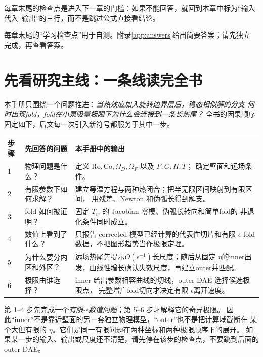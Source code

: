\documentclass[UTF8,zihao=-4,openany]{ctexbook}
\newcommand{\eps}{\epsilon}
\newcommand{\Ro}{\mathrm{Ro}}
\newcommand{\Co}{\mathrm{Co}}
\begin{document}
每章末尾的检查点是进入下一章的门槛：如果不能回答，就回到本章中标为“输入--
代入--输出”的三行，而不是跳过公式直接看结论。

每章末尾的“学习检查点”用于自测。附录\ref{app:answers}给出简要答案；请先独立
完成，再查看答案。

\chapter*{先看研究主线：一条线读完全书}

本手册只围绕一个问题推进：\emph{当热效应加入旋转边界层后，稳态相似解的分支
何时出现fold，fold在小泵吸量极限下为什么会连接到一条长热尾？} 全书的因果顺序
固定如下，后文每一次引入新符号都服务于其中一步。

\begin{center}
\begin{tabular}{p{}p{}p{}}
\toprule
步骤 & 先回答的问题 & 本手册中的输出 \\
\midrule
1 & 物理问题是什么？ & 定义 $\Ro,\Co,\Omega_D,\Omega_F$ 以及 $F,G,H,T$；
确定壁面和远场条件。 \\
2 & 有限参数下如何求解？ & 建立等温方程与两种热闭合；把半无限区间映射到有限区间，
用残差、Newton 和伪弧长得到解支。 \\
3 & fold 如何被证明？ & 固定 $T_w$ 的 Jacobian 零模、伪弧长转向和简单fold的
非退化条件同时成立。 \\
4 & 数值上看到了什么？ & 只报告 corrected 模型已经计算的代表性切片和有限-$\eps$
fold 数据，不把图形趋势当作极限定理。 \\
5 & 为什么要分内区和外区？ & 远场热尾先提示$O(\eps^{-1})$长尺度；随后从固定
$\eta$的inner出发，由线性增长确认失效尺度，再建立outer并匹配。 \\
6 & 极限由谁选择？ & inner 给出参数相容曲线的切线，outer DAE 选择候选极限点，
完整增广fold切向才决定有限-$\eps$离开速度。 \\
\bottomrule
\end{tabular}
\end{center}

\begin{warningbox}[：阅读顺序]
第 1--4 步先完成一个\emph{有限-$\eps$数值问题}；第 5--6 步才解释它的奇异极限。
因此“inner”不是靠近壁面的另一套独立物理模型，“outer”也不是把计算域截断在
某个大但有限的 $\eta$。它们是同一有限问题在两种坐标和两种极限顺序下的展开。
如果某一步的输入、输出或尺度还不清楚，请先停在该步的检查点，不要跳到后面的
outer DAE。
\end{warningbox}
\end{document}
